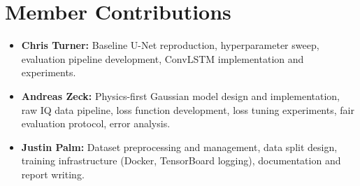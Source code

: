 \documentclass[conference]{IEEEtran}
\begin{document}
\section*{Member Contributions}

\begin{itemize}
  \item \textbf{Chris Turner:} Baseline U-Net reproduction, hyperparameter sweep, evaluation pipeline development, ConvLSTM implementation and experiments.
  \item \textbf{Andreas Zeck:} Physics-first Gaussian model design and implementation, raw IQ data pipeline, loss function development, loss tuning experiments, fair evaluation protocol, error analysis.
  \item \textbf{Justin Palm:} Dataset preprocessing and management, data split design, training infrastructure (Docker, TensorBoard logging), documentation and report writing.
\end{itemize}



\end{document}
